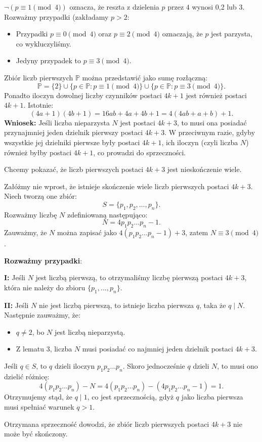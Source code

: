 \begin{solution}
$\neg\left(p \equiv 1 \pmod{4}\right)$ oznacza, że reszta z dzielenia $p$ przez $4$ wynosi 0,2 lub 3.
Rozważmy przypadki (zakładamy $p > 2$:
\begin{itemize}
	\item Przypadki $p \equiv 0 \pmod{4}$ oraz $p \equiv 2 \pmod{4}$ oznaczają, że $p$ jest parzysta, co wykluczyliśmy.
	\item Jedyny przypadek to $p \equiv 3 \pmod{4}$.
\end{itemize}
\begin{lemma}[3]
Zbiór liczb pierwszych $\mathbb{P}$ można przedstawić jako sumę rozłączną:
\[
\mathbb{P} = \{2\} \cup \{p \in \mathbb{P} : p \equiv 1 \pmod{4}\} \cup \{p \in \mathbb{P} : p \equiv 3 \pmod{4}\}.
\]
Ponadto iloczyn dowolnej liczby czynników postaci $4k+1$ jest również postaci $4k+1$. Istotnie:
\[
(4a + 1)(4b + 1) = 16ab + 4a + 4b + 1 = 4(4ab + a + b) + 1.
\]
\textbf{Wniosek:} Jeśli liczba nieparzysta $N$ jest postaci $4k+3$, to musi ona posiadać przynajmniej jeden dzielnik pierwszy postaci $4k+3$. W przeciwnym razie, gdyby wszystkie jej dzielniki pierwsze były postaci $4k+1$, ich iloczyn (czyli liczba $N$) również byłby postaci $4k+1$, co prowadzi do sprzeczności.
\end{lemma} 

Chcemy pokazać, że liczb pierwszych postaci $4k + 3$ jest nieskończenie wiele. 

Załóżmy nie wprost, że istnieje skończenie wiele liczb pierwszych postaci $4k+3$. Niech tworzą one zbiór:
\[
S = \{p_1, p_2, \dots, p_n\}.
\]
Rozważmy liczbę $N$ zdefiniowaną następująco:
\[
N = 4p_1 p_2 \dots p_n - 1.
\]
Zauważmy, że $N$ można zapisać jako $4(p_1 p_2 \dots p_n - 1) + 3$, zatem $N \equiv 3 \pmod{4}$. 

\noindent \textbf{Rozważmy przypadki}: 

\noindent\textbf{I:}  Jeśli $N$ jest liczbą pierwszą, to otrzymaliśmy liczbę pierwszą postaci $4k+3$, która nie należy do zbioru $\{p_1,\ldots,p_{n} \} $.

\noindent\textbf{II:}  Jeśli $N$ nie jest liczbą pierwszą, to istnieje liczba pierwsza $q$, taka że $q \mid N$. Następnie zauważmy, że:

\begin{itemize}
	\item $q \neq 2$, bo $N$ jest liczbą nieparzystą.
	\item Z lematu 3, liczba $N$ musi posiadać co najmniej jeden dzielnik postaci $4k + 3$. 
\end{itemize}

Jeśli $q \in S$, to $q$ dzieli iloczyn $p_1 p_2 \dots p_n$. Skoro jednocześnie $q$ dzieli $N$, to musi ono dzielić różnicę:
\[
4(p_1 p_2 \dots p_n) - N = 4(p_1 p_2 \dots p_n) - (4p_1 p_2 \dots p_n - 1) = 1.
\]
Otrzymujemy stąd, że $q \mid 1$, co jest sprzecznością, gdyż $q$ jako liczba pierwsza musi spełniać warunek $q > 1$.

Otrzymana sprzeczność dowodzi, że zbiór liczb pierwszych postaci $4k+3$ nie może być skończony.

\end{solution} 

